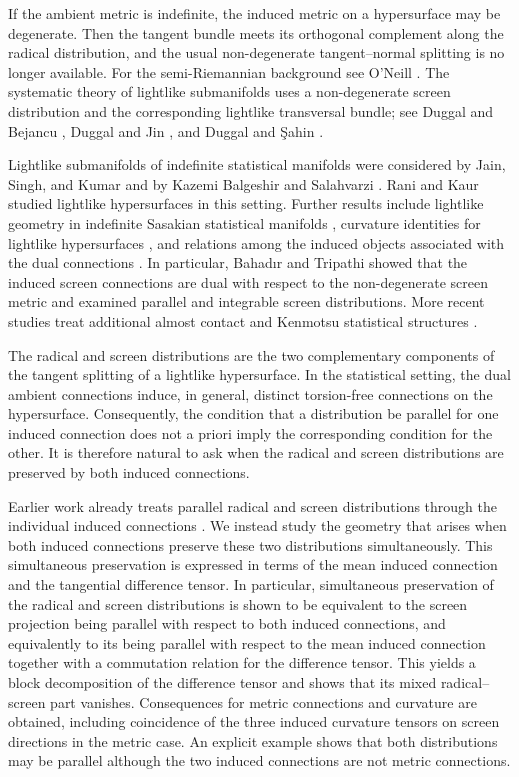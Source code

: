 \documentclass[11pt,a4paper]{article}
\theoremstyle{remark}
\theoremstyle{definition}
\begin{document}
If the ambient metric is indefinite, the induced metric on a hypersurface may
be degenerate. Then the tangent bundle meets its orthogonal complement along
the radical distribution, and the usual non-degenerate tangent--normal
splitting is no longer available. For the semi-Riemannian background see
O'Neill \cite{ONeill1983}. The systematic theory of lightlike submanifolds
uses a non-degenerate screen distribution and the corresponding lightlike
transversal bundle; see Duggal and Bejancu \cite{DuggalBejancu1996}, Duggal
and Jin \cite{DuggalJin2007}, and Duggal and \c{S}ahin
\cite{DuggalSahin2010}.

Lightlike submanifolds of indefinite statistical manifolds were considered by
Jain, Singh, and Kumar \cite{JainSinghKumar2020} and by Kazemi Balgeshir and
Salahvarzi \cite{KazemiSalahvarzi2020}. Rani and Kaur
\cite{RaniKaur2021} studied lightlike hypersurfaces in this setting.
Further results include lightlike geometry in indefinite Sasakian statistical
manifolds \cite{Bahadir2021}, curvature identities for lightlike
hypersurfaces \cite{BahadirEtAl2022}, and relations among the induced objects
associated with the dual connections \cite{BahadirTripathi2023}. In
particular, Bahad{\i}r and Tripathi showed that the induced screen
connections are dual with respect to the non-degenerate screen metric and
examined parallel and integrable screen distributions. More recent studies treat additional almost contact and Kenmotsu
statistical structures \cite{BhattiKaur2024,AhmadAlamAli2025}.

The radical and screen distributions are the two complementary components of
the tangent splitting of a lightlike hypersurface. In the statistical setting,
the dual ambient connections induce, in general, distinct torsion-free
connections on the hypersurface. Consequently, the condition that a
distribution be parallel for one induced connection does not a priori imply
the corresponding condition for the other. It is therefore natural to ask
when the radical and screen distributions are preserved by both induced
connections.

Earlier work already treats parallel radical and screen distributions through
the individual induced connections
\cite{JainSinghKumar2020,RaniKaur2021,BahadirTripathi2023}. We instead study
the geometry that arises when both induced connections preserve these two
distributions simultaneously. This simultaneous preservation is expressed in
terms of the mean induced connection and the tangential difference tensor. In
particular, simultaneous preservation of the radical and screen distributions
is shown to be equivalent to the screen projection being parallel with respect
to both induced connections, and equivalently to its being parallel with
respect to the mean induced connection together with a commutation relation for
the difference tensor. This yields a block decomposition of the difference
tensor and shows that its mixed radical--screen part vanishes. Consequences for
metric connections and curvature are obtained, including coincidence of the
three induced curvature tensors on screen directions in the metric case. An
explicit example shows that both distributions may be parallel although the
two induced connections are not metric connections.
\end{document}
